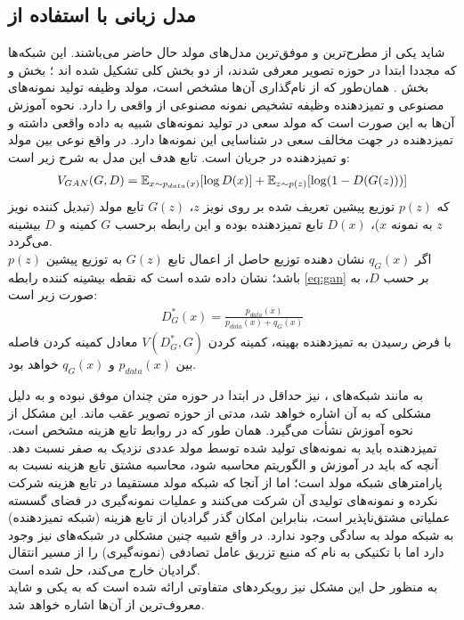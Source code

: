 \subsection{مدل زبانی با استفاده از \gan{}}
شاید  یکی از مطرح‌ترین و موفق‌ترین مدل‌های مولد حال حاضر می‌باشند. این شبکه‌ها که مجددا ابتدا در حوزه تصویر معرفی شدند، از دو بخش کلی تشکیل شده اند \cite{gan}؛ بخش  و بخش . همان‌طور که از نام‌گذاری آن‌ها مشخص است، مولد وظیفه تولید نمونه‌های مصنوعی و تمیزدهنده وظیفه تشخیص نمونه مصنوعی از واقعی را دارد. نحوه آموزش آن‌ها به این صورت است که مولد سعی در تولید نمونه‌های شبیه به داده واقعی داشته و تمیزدهنده در جهت مخالف سعی در شناسایی این نمونه‌ها دارد. در واقع نوعی  بین مولد و تمیزدهنده در جریان است. تابع هدف این مدل به شرح زیر است:
\begin{equation} \label{eq:gan}
	\begin{split}
		V_{GAN} (G, D) = \expected_{x \sim p_{data}(x)} [\log D(x)] + \expected_{z \sim p(z)} [\log (1 - D(G(z)))]
	\end{split}
\end{equation}
که  $p(z)$ توزیع پیشین تعریف شده بر روی نویز $z$،
$G(z)$
تابع مولد (تبدیل کننده نویز $z$ به نمونه $x$)، $D(x)$ تابع تمیزدهنده بوده و این رابطه برحسب $G$ کمینه و $D$ بیشینه می‌گردد.\\
اگر $q_G(x)$ نشان دهنده توزیع حاصل از اعمال تابع $G(z)$ به توزیع پیشین $p(z)$ باشد؛ نشان داده شده است که نقطه بیشینه کننده رابطه \ref{eq:gan} بر حسب $D$، به صورت زیر است:
\begin{gather}
	D_G^*(x) = \frac{p_{data}(x)}{p_{data}(x) + q_G(x)}
\end{gather}
با فرض رسیدن به تمیزدهنده بهینه، کمینه کردن $V(D^*_G,G)$ معادل کمینه کردن فاصله  بین $p_{data}(x)$ و $q_G(x)$ خواهد بود.

به مانند شبکه‌های \vae{}، \gan{} نیز حداقل در ابتدا در حوزه متن چندان موفق نبوده و به دلیل مشکلی که به آن اشاره خواهد شد، مدتی از حوزه تصویر عقب ماند. این مشکل از نحوه آموزش نشأت می‌گیرد. همان طور که در روابط تابع هزینه مشخص است، تمیزدهنده باید به نمونه‌های تولید شده توسط مولد عددی نزدیک به صفر نسبت دهد. آنچه که باید در آموزش و الگوریتم  محاسبه شود، محاسبه مشتق تابع هزینه نسبت به پارامتر‌های شبکه مولد است؛ اما از آنجا که شبکه مولد مستقیما در تابع هزینه شرکت نکرده و نمونه‌های تولیدی آن شرکت می‌کنند و عملیات نمونه‌گیری در فضای گسسته عملیاتی مشتق‌ناپذیر است، بنابراین امکان گذر گرادیان از تابع هزینه (شبکه تمیزدهنده) به شبکه مولد به سادگی وجود ندارد. در واقع شبیه چنین مشکلی در شبکه‌های \vae{} نیز وجود دارد اما با تکنیکی به نام  که منبع تزریق عامل تصادفی (نمونه‌گیری) را از مسیر انتقال گرادیان خارج می‌کند، حل شده است.\\
به منظور حل این مشکل نیز رویکرد‌های متفاوتی ارائه شده است که به یکی و شاید معروف‌ترین از آن‌ها اشاره خواهد شد.\\
